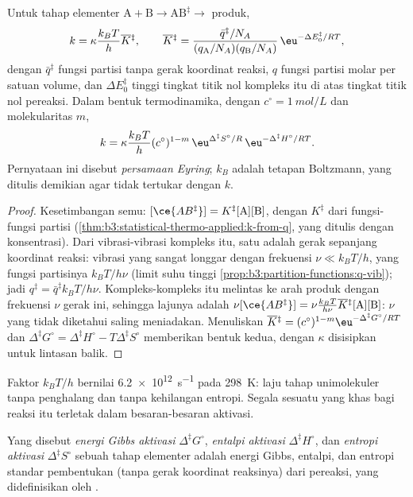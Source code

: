 \begin{theorem}\label{thm:b3:rate-theories:eyring}
Untuk tahap elementer $\mathrm{A + B} \to \mathrm{AB}^{\ddagger} \to$ produk,
\[
  k = \kappa\frac{k_BT}{h}\overline{K}{}^{\ddagger}, \qquad
  \overline{K}{}^{\ddagger} = \frac{\bar q^{\ddagger}/N_A}{(q_{\mathrm A}/N_A)(q_{\mathrm B}/N_A)}\,\eu^{-\Delta E_0^{\ddagger}/RT},
\]
dengan $\bar q^{\ddagger}$ fungsi partisi  tanpa gerak koordinat
reaksi, $q$ fungsi partisi molar per satuan volume, dan $\Delta E_0^{\ddagger}$ tinggi
tingkat titik nol kompleks itu di atas tingkat titik nol pereaksi. Dalam
bentuk termodinamika, dengan $c^\circ = \qty{1}{mol/L}$ dan molekularitas $m$,
\[
  k = \kappa\frac{k_BT}{h}(c^\circ)^{1-m}\,\eu^{\Delta^{\ddagger}S^\circ/R}\,\eu^{-\Delta^{\ddagger}H^\circ/RT}.
\]
Pernyataan ini disebut \emph{persamaan Eyring}; $k_B$
adalah tetapan Boltzmann, yang ditulis demikian agar tidak tertukar dengan $k$.
\end{theorem}

\begin{proof}
Kesetimbangan semu: $[\ce{AB^{\ddagger}}] = K^{\ddagger}[\mathrm A][\mathrm B]$, dengan $K^{\ddagger}$
dari fungsi-fungsi partisi
(\cref{thm:b3:statistical-thermo-applied:k-from-q}, yang ditulis dengan
konsentrasi). Dari vibrasi-vibrasi kompleks itu, satu adalah gerak sepanjang
koordinat reaksi: vibrasi yang sangat longgar dengan frekuensi
$\nu \ll k_BT/h$, yang fungsi partisinya $k_BT/h\nu$ (limit suhu tinggi
\cref{prop:b3:partition-functions:q-vib}); jadi $q^{\ddagger} = \bar q^{\ddagger}k_BT/h\nu$.
Kompleks-kompleks itu melintas ke arah produk dengan frekuensi $\nu$ gerak ini,
sehingga lajunya adalah $\nu[\ce{AB^{\ddagger}}] = \nu\frac{k_BT}{h\nu}\overline{K}{}^{\ddagger}[\mathrm A][\mathrm B]$:
$\nu$ yang tidak diketahui saling meniadakan. Menuliskan
$\overline{K}{}^{\ddagger} = (c^\circ)^{1-m}\eu^{-\Delta^{\ddagger}G^\circ/RT}$ dan
$\Delta^{\ddagger}G^\circ = \Delta^{\ddagger}H^\circ - T\Delta^{\ddagger}S^\circ$ memberikan bentuk
kedua, dengan $\kappa$ disisipkan untuk lintasan balik.
\end{proof}

Faktor $k_BT/h$ bernilai \qty{6.2e12}{s^{-1}} pada \qty{298}{K}: laju tahap
unimolekuler tanpa penghalang dan tanpa kehilangan entropi. Segala sesuatu
yang khas bagi reaksi itu terletak dalam besaran-besaran aktivasi.

\begin{definition}\label{def:b3:rate-theories:activation}
Yang disebut \emph{energi Gibbs aktivasi}
$\Delta^{\ddagger}G^\circ$, \emph{entalpi aktivasi}
$\Delta^{\ddagger}H^\circ$, dan \emph{entropi aktivasi}
$\Delta^{\ddagger}S^\circ$ sebuah tahap elementer adalah energi Gibbs, entalpi,
dan entropi standar pembentukan  (tanpa gerak koordinat
reaksinya) dari pereaksi, yang didefinisikan oleh .
\end{definition}

